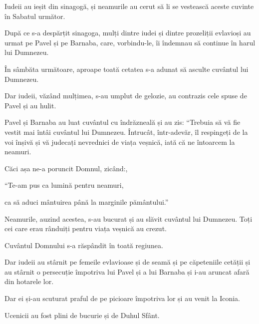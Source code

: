 {\par }{\PP {}Iudeii au ieșit din sinagogă, și neamurile au cerut să li se vestească aceste cuvinte în Sabatul următor.

După ce s-a despărțit sinagoga, mulți dintre iudei și dintre prozeliții evlavioși au urmat pe Pavel și pe Barnaba, care, vorbindu-le, îi îndemnau să continue în harul lui Dumnezeu.


\par }{\PP {}În sâmbăta următoare, aproape toată cetatea s-a adunat să asculte cuvântul lui Dumnezeu.

Dar iudeii, văzând mulțimea, s-au umplut de gelozie, au contrazis cele spuse de Pavel și au hulit.


\par }{\PP {}Pavel și Barnaba au luat cuvântul cu îndrăzneală și au zis: “Trebuia să vă fie vestit mai întâi cuvântul lui Dumnezeu. Întrucât, într-adevăr, îl respingeți de la voi înșivă și vă judecați nevrednici de viața veșnică, iată că ne întoarcem la neamuri.

Căci așa ne-a poruncit Domnul, zicând:,

\par }{\Q “Te-am pus ca lumină pentru neamuri,

\par }{\QB ca să aduci mântuirea până la marginile pământului.”


\par }{\PP {}Neamurile, auzind acestea, s-au bucurat și au slăvit cuvântul lui Dumnezeu. Toți cei care erau rânduiți pentru viața veșnică au crezut.

Cuvântul Domnului s-a răspândit în toată regiunea.

Dar iudeii au stârnit pe femeile evlavioase și de seamă și pe căpeteniile cetății și au stârnit o persecuție împotriva lui Pavel și a lui Barnaba și i-au aruncat afară din hotarele lor.

Dar ei și-au scuturat praful de pe picioare împotriva lor și au venit la Iconia.

Ucenicii au fost plini de bucurie și de Duhul Sfânt.



\par }
